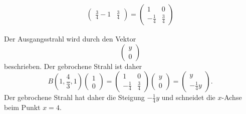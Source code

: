 \begin{loesung}
\begin{teilaufgaben}
\begin{align*}
\begin{pmatrix}
\frac{3}{4}-1 & \frac{3}{4}
\end{pmatrix}
=
\begin{pmatrix}
1&0\\
-\frac{1}{4} & \frac{3}{4}
\end{pmatrix}
\end{align*}
\item
Der Ausgangsstrahl wird durch den Vektor
\[
\begin{pmatrix}y\\0\end{pmatrix}
\]
beschrieben.
Der gebrochene Strahl ist daher
\[
B(1,{\textstyle\frac43},1)
\begin{pmatrix}
1\\0
\end{pmatrix}
=
\begin{pmatrix}
1&0\\
-\frac{1}{4} & \frac{3}{4}
\end{pmatrix}
\begin{pmatrix}
y\\0
\end{pmatrix}
=
\begin{pmatrix}
y\\
-\frac14y
\end{pmatrix}.
\]
Der gebrochene Strahl hat daher die Steigung $-\frac14y$ und schneidet die
$x$-Achse beim Punkt $x=4$.
\qedhere
\end{teilaufgaben}
\end{loesung}
